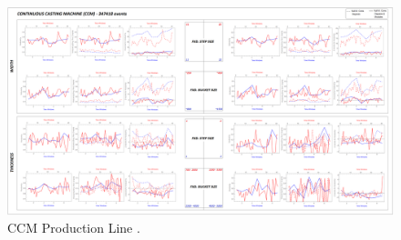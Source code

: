 \begin{landscape}
\begin{figure}[ht]
	\centering
	\hspace*{-1.3cm}
	\captionsetup{width=1.1\linewidth}
	\includegraphics[width=1.6\textwidth]{../images/supplements-CCM_real_life_events_analysis-results-curves_and_time_resolutions.png}
	\caption{CCM Production Line \cc{} \dd{}.}
	\label{figure-supplements-CCM-curveplots_sliding}
\end{figure}
\end{landscape}